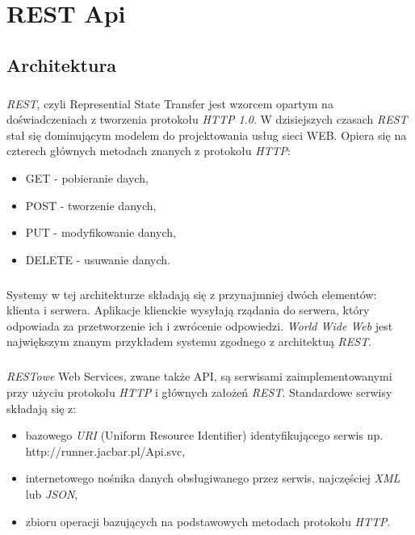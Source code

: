 \chapter{REST Api} %
\label{cha:restapi}
\section{Architektura} %
\label{sec:architektura}
\paragraph{} %
\label{par:}
\textit{REST}, czyli Represential State Transfer jest wzorcem opartym na doświadczeniach z tworzenia protokołu \textit{HTTP 1.0}. W dzisiejszych czasach \textit{REST} stał się dominującym modelem do projektowania usług sieci WEB. Opiera się na czterech głównych metodach znanych z protokołu \textit{HTTP}: 

\begin{itemize}
	\item GET - pobieranie daych,
	\item POST - tworzenie danych,
	\item PUT - modyfikowanie danych,
	\item DELETE - usuwanie danych.
\end{itemize}

\paragraph{} %
\label{par:}
Systemy w tej architekturze składają się z przynajmniej dwóch elementów: klienta i serwera. Aplikacje klienckie wysyłają rządania do serwera, który odpowiada za przetworzenie ich i zwrócenie odpowiedzi.
\textit{World Wide Web} jest największym znanym przykładem systemu zgodnego z architektuą \textit{REST}.

\paragraph{} %
\label{par:}
\textit{RESTowe} Web Services, zwane także API, są serwisami zaimplementowanymi przy użyciu protokołu \textit{HTTP} i głównych założeń \textit{REST}. Standardowe serwisy składają się z:
\begin{itemize}
	\item bazowego \textit{URI} (Uniform Resource Identifier) identyfikującego serwis np. http://runner.jacbar.pl/Api.svc,
	\item internetowego nośnika danych obsługiwanego przez serwis, najczęściej \textit{XML} lub \textit{JSON},
	\item zbioru operacji bazujących na podstawowych metodach protokołu \textit{HTTP}.
\end{itemize}


